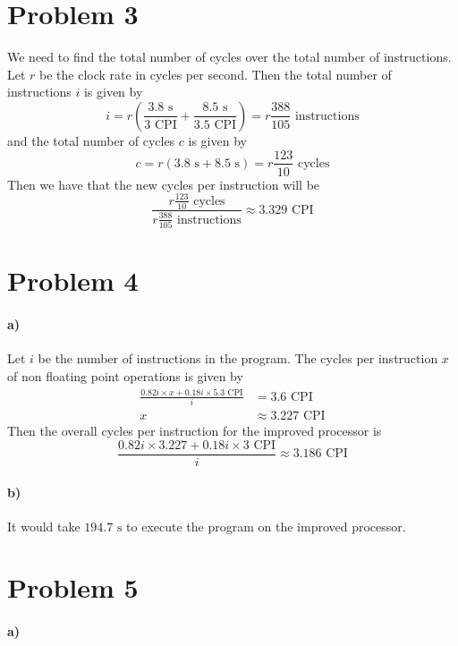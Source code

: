 \documentclass[12pt]{article}
\begin{document}
\section*{Problem 3}

We need to find the total number of cycles over the total number of instructions.
Let \(r\) be the clock rate in cycles per second. Then the total number of instructions \(i\) is given by
\[i=r\left(\frac{3.8\text{ s}}{3\text{ CPI}}+\frac{8.5\text{ s}}{3.5\text{ CPI}}\right)=r\frac{388}{105}\text{ instructions}\]
and the total number of cycles \(c\) is given by
\[c=r(3.8\text{ s}+8.5\text{ s})=r\frac{123}{10}\text{ cycles}\]
Then we have that the new cycles per instruction will be
\[\frac{r\frac{123}{10}\text{ cycles}}{r\frac{388}{105}\text{ instructions}}\approx 3.329 \text{ CPI}\]

\section*{Problem 4}

\paragraph{a)}

Let \(i\) be the number of instructions in the program. The cycles per instruction \(x\) of non floating point operations is given by
\begin{align*}
        \frac{0.82i\times x+0.18i\times 5.3\text{ CPI}}{i}&=3.6\text{ CPI}\\
        x&\approx 3.227 \text{ CPI}
\end{align*}
Then the overall cycles per instruction for the improved processor is
\[\frac{0.82i\times 3.227+0.18i\times 3\text{ CPI}}{i} \approx 3.186\text{ CPI}\]

\paragraph{b)}

It would take \(194.7\text{ s}\) to execute the program on the improved processor.

\section*{Problem 5}

\paragraph{a)}
\end{document}
